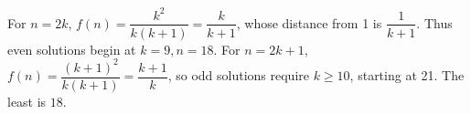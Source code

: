 For $n=2k$, $f(n)=\dfrac{k^2}{k(k+1)}=\dfrac{k}{k+1}$, whose distance from 1 is $\dfrac{1}{k+1}$. Thus even solutions begin at $k=9,n=18$. For $n=2k+1$, $f(n)=\dfrac{(k+1)^2}{k(k+1)}=\dfrac{k+1}{k}$, so odd solutions require $k\ge10$, starting at 21. The least is $\boxed{18}$.
